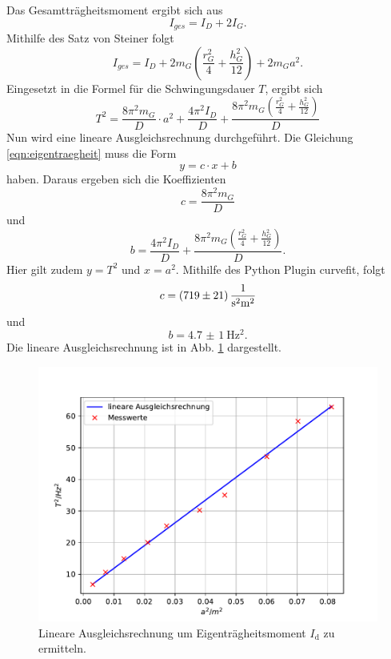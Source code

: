 \FloatBarrier
Das Gesamtträgheitsmoment ergibt sich aus
\begin{equation*}
    I_{ges} = I_D + 2 I_G .
\end{equation*}
Mithilfe des Satz von Steiner folgt %
\begin{equation*}
    I_{ges} = I_D + 2 m_G \left ( \frac{r^2_G}{4} + \frac{h^2_G}{12} \right) + 2 m_G a^2 .
\end{equation*}
Eingesetzt in die Formel für die Schwingungsdauer $T$, ergibt sich %
\begin{equation}
    T^2 = \frac{8 \pi^2 m_G}{D} \cdot a^2 + \frac{4 \pi^2 I_D}{D} + \frac{8 \pi^2 m_G \left (\frac{r^2_G}{4} + \frac{h^2_G}{12} \right )}{D}
    \label{eqn:eigentraegheit}
\end{equation}
Nun wird eine lineare Ausgleichsrechnung durchgeführt.
Die Gleichung \ref{eqn:eigentraegheit} muss die Form
\begin{equation*}
    y = c \cdot x + b 
\end{equation*}
haben.
Daraus ergeben sich die Koeffizienten
\begin{equation*}
    c = \frac{8\pi^2m_G}{D}
\end{equation*}
und
\begin{equation}
    b = \frac{4 \pi^2 I_D}{D} + \frac{8 \pi^2 m_G \left (\frac{r^2_G}{4} + \frac{h^2_G}{12} \right )}{D}.
    \label{eqn:b}
\end{equation}
Hier gilt zudem $y = T^2$ und $x = a^2$.
Mithilfe des Python Plugin curvefit, folgt %
\begin{equation*}
    c = \SI{719(21)}{\frac{1}{\second^2 \metre^2}}
\end{equation*}
und
\begin{equation*}
    b = \SI{4.7(10)}{\hertz^2} .
\end{equation*}
Die lineare Ausgleichsrechnung ist in Abb. \ref{fig:ausgleich} dargestellt.
\begin{figure}
    \centering
    \includegraphics[width=\textwidth]{content/data/ausgleich.pdf}
    \caption{Lineare Ausgleichsrechnung um Eigenträgheitsmoment $I_\text{d}$ zu ermitteln.}
    \label{fig:ausgleich}
\end{figure}
